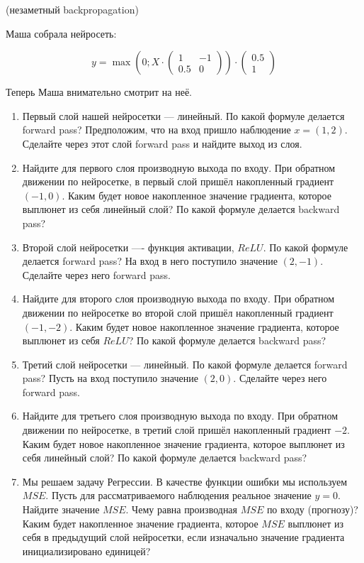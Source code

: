 \begin{problem}{(незаметный backpropagation)}
    
    Маша собрала нейросеть: 
	
	\begin{equation*}
	y =   \max \left( 0;  X \cdot  \begin{pmatrix} 1 & -1 \\ 0.5 & 0 \end{pmatrix} \right) \cdot \begin{pmatrix} 0.5 \\ 1 \end{pmatrix} 
	\end{equation*}

	Теперь Маша внимательно смотрит на неё.
	
	\begin{enumerate}
		\item  Первый слой нашей нейросетки --- линейный. По какой формуле делается forward pass? Предположим, что на вход пришло наблюдение $x = (1, 2)$. Сделайте через этот слой forward pass и найдите выход из слоя.
		
		\item Найдите для первого слоя производную выхода по входу. При обратном движении по нейросетке, в первый слой пришёл накопленный градиент $(-1, 0)$. Каким будет новое накопленное значение градиента, которое выплюнет из себя линейный слой? По какой формуле делается backward pass? 
		
		\item Второй слой нейросетки ---- функция активации, $ReLU.$  По какой формуле делается forward pass? На вход в него поступило значение $(2, -1)$. Сделайте через него forward pass. 
		
		\item Найдите для второго слоя производную выхода по входу. При обратном движении по нейросетке во второй слой пришёл накопленный градиент $(-1, -2)$.  Каким будет новое накопленное значение градиента, которое выплюнет из себя $ReLU$?  По какой формуле делается backward pass? 
		
		\item Третий слой нейросетки --- линейный.  По какой формуле делается forward pass? Пусть на вход поступило значение $(2,0)$.  Сделайте через него forward pass. 
		
		\item Найдите для третьего слоя производную выхода по входу. При обратном движении по нейросетке, в третий слой пришёл накопленный градиент $-2$. Каким будет новое накопленное значение градиента, которое выплюнет из себя линейный слой?  По какой формуле делается backward pass? 
		\item Мы решаем задачу Регрессии. В качестве функции ошибки мы используем $MSE$. Пусть для рассматриваемого наблюдения реальное значение $y = 0$. Найдите значение $MSE$. Чему равна производная $MSE$ по входу (прогнозу)? Каким будет накопленное значение градиента, которое $MSE$ выплюнет из себя в предыдущий слой нейросетки, если изначально значение градиента инициализировано единицей? 
		

\end{enumerate}
\end{problem}
